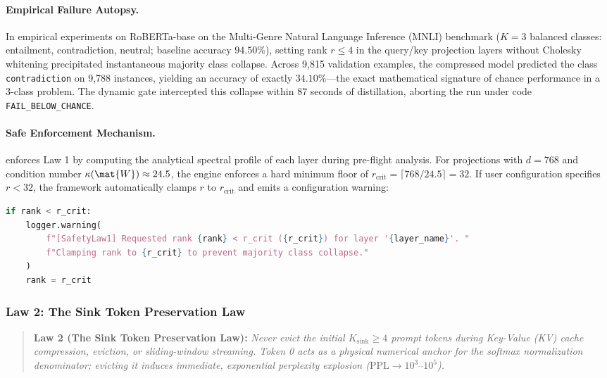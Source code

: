 \paragraph{Empirical Failure Autopsy.}
In empirical experiments on RoBERTa-base on the Multi-Genre Natural Language Inference (MNLI) benchmark ($K=3$ balanced classes: entailment, contradiction, neutral; baseline accuracy $94.50\%$), setting rank $r \le 4$ in the query/key projection layers without Cholesky whitening precipitated instantaneous majority class collapse. Across 9,815 validation examples, the compressed model predicted the class \texttt{contradiction} on 9,788 instances, yielding an accuracy of exactly $34.10\%$---the exact mathematical signature of chance performance in a 3-class problem. The dynamic gate intercepted this collapse within 87 seconds of distillation, aborting the run under code \texttt{FAIL\_BELOW\_CHANCE}.

\paragraph{Safe Enforcement Mechanism.}
\neuralops{} enforces Law 1 by computing the analytical spectral profile of each layer during pre-flight analysis. For projections with $d = 768$ and condition number $\kappa(\mat{W}) \approx 24.5$, the engine enforces a hard minimum floor of $r_{\text{crit}} = \lceil 768 / 24.5 \rceil = 32$. If user configuration specifies $r < 32$, the framework automatically clamps $r$ to $r_{\text{crit}}$ and emits a configuration warning:
\begin{lstlisting}[language=Python]
if rank < r_crit:
    logger.warning(
        f"[SafetyLaw1] Requested rank {rank} < r_crit ({r_crit}) for layer '{layer_name}'. "
        f"Clamping rank to {r_crit} to prevent majority class collapse."
    )
    rank = r_crit
\end{lstlisting}

\subsubsection{Law 2: The Sink Token Preservation Law}
\label{sec:law2_sink_tokens}

\begin{quote}
\textbf{Law 2 (The Sink Token Preservation Law):} \emph{Never evict the initial $K_{\text{sink}} \ge 4$ prompt tokens during Key-Value (KV) cache compression, eviction, or sliding-window streaming. Token 0 acts as a physical numerical anchor for the softmax normalization denominator; evicting it induces immediate, exponential perplexity explosion ($\text{PPL} \to 10^3\text{--}10^5$).}
\end{quote}

